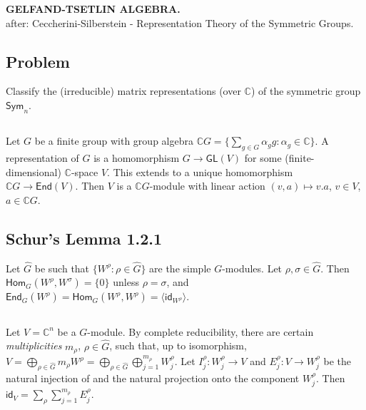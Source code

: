 \documentclass[a4paper]{amsart}
\newcommand{\C}{\mathbb{C}}
\newcommand{\Sym}{\mathsf{Sym}}
\newcommand{\GL}{\mathsf{GL}}
\newcommand{\Hom}{\mathsf{Hom}}
\newcommand{\End}{\mathsf{End}}
\newcommand{\id}{\mathsf{id}}
\newcommand{\Span}[1]{\langle#1\rangle}
\begin{document}
\begin{center}
  \textbf{\uppercase{
Gelfand-Tsetlin Algebra.
}}\\
after: Ceccherini-Silberstein - Representation Theory of the Symmetric Groups.
\end{center}

\subsection{Problem}
Classify the (irreducible) matrix representations (over $\C$) of the symmetric group $\Sym_n$.

\subsection{}
Let $G$ be a finite group with group algebra $\C G = \{ \sum_{g \in G}
\alpha_g g : \alpha_g \in \C \}$.  A representation of $G$ is a
homomorphism $G \to \GL(V)$ for some (finite-dimensional) $\C$-space
$V$.  This extends to a unique homomorphism $\C G \to \End(V)$. Then
$V$ is a $\C G$-module with linear action $(v, a) \mapsto v.a$, $v \in
V$, $a \in \C G$.  

\subsection{Schur's Lemma 1.2.1}
Let $\hat{G}$ be such that $\{W^{\rho}: \rho \in \hat{G}\}$ are the simple
$G$-modules.  Let $\rho, \sigma \in \hat{G}$.  Then $\Hom_G(W^{\rho},
W^{\sigma}) = \{0\}$ unless $\rho = \sigma$, and $\End_G(W^{\rho}) =
\Hom_G(W^{\rho}, W^{\rho}) = \Span{\id_{W^{\rho}}}$.


\subsection{}
Let $V = \C^n$ be a $G$-module.  By complete reducibility, there are
certain \emph{multiplicities} $m_{\rho}$, $\rho \in \hat{G}$, such that, up
to isomorphism, $V = \bigoplus_{\rho \in \hat{G}} m_{\rho} W^{\rho} =
\bigoplus_{\rho \in \hat{G}} \bigoplus_{j = 1}^{m_{\rho}} W^{\rho}_j$.  Let
$I^{\rho}_j \colon W^{\rho}_j \to V$ and $E^{\rho}_j \colon V \to
W^{\rho}_j$ be the natural injection of and the natural projection
onto the component $W^{\rho}_j$.  Then $\id_V = \sum_{\rho} \sum_{j=1}^{m_\rho} E^{\rho}_j$.


\end{document}
